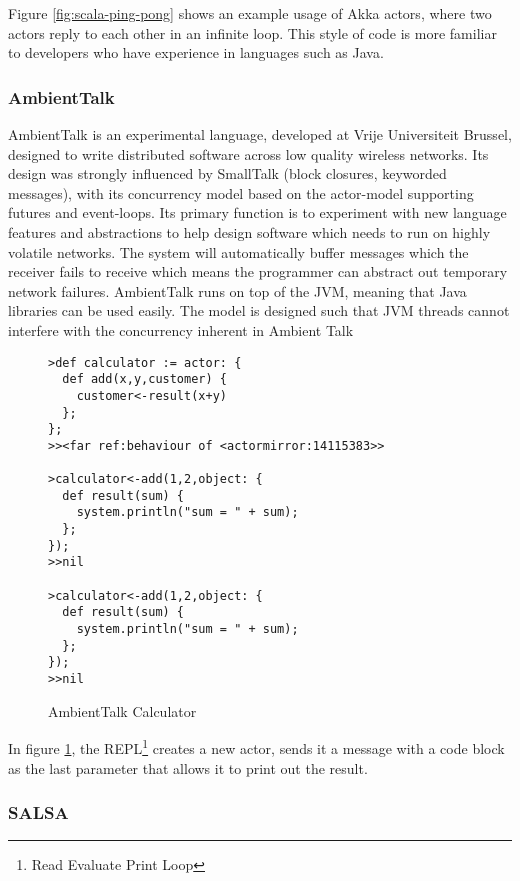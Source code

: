 \documentclass{article}
\begin{document}
Figure \ref{fig:scala-ping-pong} shows an example usage of Akka actors, where two actors reply to each other in an infinite loop.
This style of code is more familiar to developers who have experience in languages such as Java.

\subsubsection{AmbientTalk}
\label{sec:ambienttalk}

AmbientTalk is an experimental language, developed at Vrije Universiteit Brussel, designed to write distributed software across low quality wireless networks.
Its design was strongly influenced by SmallTalk (block closures, keyworded messages), with its concurrency model based on the actor-model supporting futures and event-loops.
Its primary function is to experiment with new language features and abstractions to help design software which needs to run on highly volatile networks.
The system will automatically buffer messages which the receiver fails to receive which means the programmer can abstract out temporary network failures\cite{ambienttalk-failure}.
AmbientTalk runs on top of the JVM, meaning that Java libraries can be used easily.
The model is designed such that JVM threads cannot interfere with the concurrency inherent in Ambient Talk\cite{ambienttalk-interfere}

\begin{figure}[H]
\begin{verbatim}
>def calculator := actor: {
  def add(x,y,customer) {
    customer<-result(x+y)
  };
};
>><far ref:behaviour of <actormirror:14115383>>

>calculator<-add(1,2,object: {
  def result(sum) {
    system.println("sum = " + sum);
  };
});
>>nil

>calculator<-add(1,2,object: {
  def result(sum) {
    system.println("sum = " + sum);
  };
});
>>nil
\end{verbatim}
\caption{AmbientTalk Calculator\cite{ambienttalk-example}}
\label{fig:ambienttalk-calc}
\end{figure}

In figure \ref{fig:ambienttalk-calc}, the REPL\footnote{Read Evaluate Print Loop} creates a new actor, sends it a message with a code block as the last parameter that allows it to print out the result.

\subsubsection{SALSA}
\end{document}
